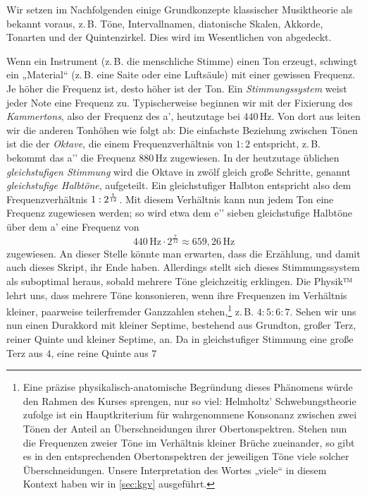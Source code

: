 Wir setzen im Nachfolgenden einige Grundkonzepte klassischer Musiktheorie als
bekannt voraus, z.\,B. Töne, Intervallnamen, diatonische Skalen, Akkorde,
Tonarten und der Quintenzirkel. Dies wird im Wesentlichen von
\cite[§\,1–6]{Skript} abgedeckt.

Wenn ein Instrument (z.\,B. die menschliche Stimme) einen Ton erzeugt, schwingt
ein „Material“ (z.\,B. eine Saite oder eine Luftsäule) mit einer gewissen
Frequenz.  Je höher die Frequenz ist, desto höher ist der Ton. Ein
\emph{Stimmungssystem} weist jeder Note eine Frequenz zu. Typischerweise
beginnen wir mit der Fixierung des \emph{Kammertons}, also der Frequenz des a’,
heutzutage bei $440$\,Hz. Von dort aus leiten wir die anderen Tonhöhen wie folgt
ab: Die einfachste Beziehung zwischen Tönen ist die der \emph{Oktave}, die einem
Frequenzverhältnis von $1:2$ entspricht, z.\,B. bekommt das a’’ die Frequenz
$880$\,Hz zugewiesen. In der heutzutage üblichen \emph{gleichstufigen Stimmung}
wird die Oktave in zwölf gleich große Schritte, genannt \emph{gleichstufige
  Halbtöne}, aufgeteilt. Ein gleichstufiger Halbton entspricht also dem
Frequenzverhältnis $1:2^{\smash{\frac1{12}}}$. Mit diesem Verhältnis kann nun
jedem Ton eine Frequenz zugewiesen werden; so wird etwa dem e’’ sieben
gleichstufige Halbtöne über dem a’ eine Frequenz von 
\[440\,\text{Hz}\cdot 2^{\frac7{12}} \approx 659{,}26\,\text{Hz}\]%
zugewiesen.  An dieser Stelle könnte man erwarten, dass die Erzählung, und damit
auch dieses Skript, ihr Ende haben. Allerdings stellt sich dieses
Stimmungssystem als suboptimal heraus, sobald mehrere Töne gleichzeitig
erklingen. Die Physik™ lehrt uns, dass mehrere Töne konsonieren, wenn ihre
Frequenzen im Verhältnis kleiner, paarweise teilerfremder Ganzzahlen
stehen,\footnote{Eine präzise physikalisch-anatomische Begründung dieses
  Phänomens würde den Rahmen des Kurses sprengen, nur so viel: Helmholtz’
  Schwebungstheorie \cite[§\,10–12]{HE} zufolge ist ein Hauptkriterium für
  wahrgenommene Konsonanz zwischen zwei Tönen der Anteil an Überschneidungen
  ihrer Obertonspektren. Stehen nun die Frequenzen zweier Töne im Verhältnis
  kleiner Brüche zueinander, so gibt es in den entsprechenden Obertonspektren
  der jeweiligen Töne viele solcher Überschneidungen. Unsere Interpretation
  des Wortes „viele“ in diesem Kontext haben wir in \cref{sec:kgv} ausgeführt.
  \vspace*{.4px}}
z.\,B. $4:5:6:7$. Sehen wir uns nun einen Durakkord mit kleiner Septime,
bestehend aus Grundton, großer Terz, reiner Quinte und kleiner Septime, an. Da
in gleichstufiger Stimmung eine große Terz aus $4$, eine reine Quinte aus $7$
